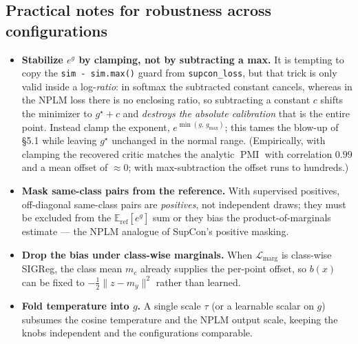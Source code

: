 \documentclass[11pt]{article}
\begin{document}
\subsection{Practical notes for robustness across configurations}
\begin{itemize}
\item \textbf{Stabilize $e^{g}$ by clamping, not by subtracting a max.} It is
tempting to copy the \texttt{sim - sim.max()} guard from \texttt{supcon\_loss},
but that trick is only valid inside a log-\emph{ratio}: in softmax the subtracted
constant cancels, whereas in the NPLM loss there is no enclosing ratio, so
subtracting a constant $c$ shifts the minimizer to $g^\star+c$ and \emph{destroys
the absolute calibration} that is the entire point. Instead clamp the exponent,
$e^{\min(g,\,g_{\max})}$; this tames the blow-up of \S5.1 while leaving $g^\star$
unchanged in the normal range. (Empirically, with clamping the recovered critic
matches the analytic $\operatorname{PMI}$ with correlation $0.99$ and a mean
offset of $\approx 0$; with max-subtraction the offset runs to hundreds.)
\item \textbf{Mask same-class pairs from the reference.} With supervised positives,
off-diagonal same-class pairs are \emph{positives}, not independent draws; they
must be excluded from the $\mathbb{E}_{\mathrm{ref}}[e^{g}]$ sum or they bias the
product-of-marginals estimate --- the NPLM analogue of SupCon's positive masking.
\item \textbf{Drop the bias under class-wise marginals.} When
$\mathcal{L}_{\text{marg}}$ is class-wise SIGReg, the class mean $m_c$ already
supplies the per-point offset, so $b(x)$ can be fixed to $-\tfrac12\|z-m_{y}\|^2$
rather than learned.
\item \textbf{Fold temperature into $g$.} A single scale $\tau$ (or a learnable
scalar on $g$) subsumes the cosine temperature and the NPLM output scale, keeping
the knobs independent and the configurations comparable.
\end{itemize}
\end{document}
